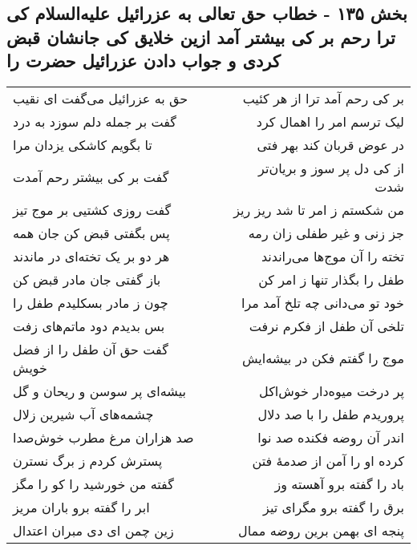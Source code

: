 \begin{center}
\section*{بخش ۱۳۵ - خطاب حق تعالی به عزرائیل علیه‌السلام کی ترا رحم بر کی بیشتر آمد ازین خلایق کی جانشان قبض کردی و جواب دادن عزرائیل حضرت را}
\label{sec:sh135}
\begin{longtable}{l p{0.5cm} r}
حق به عزرائیل می‌گفت ای نقیب
&&
بر کی رحم آمد ترا از هر کئیب
\\
گفت بر جمله دلم سوزد به درد
&&
لیک ترسم امر را اهمال کرد
\\
تا بگویم کاشکی یزدان مرا
&&
در عوض قربان کند بهر فتی
\\
گفت بر کی بیشتر رحم آمدت
&&
از کی دل پر سوز و بریان‌تر شدت
\\
گفت روزی کشتیی بر موج تیز
&&
من شکستم ز امر تا شد ریز ریز
\\
پس بگفتی قبض کن جان همه
&&
جز زنی و غیر طفلی زان رمه
\\
هر دو بر یک تخته‌ای در ماندند
&&
تخته را آن موج‌ها می‌راندند
\\
باز گفتی جان مادر قبض کن
&&
طفل را بگذار تنها ز امر کن
\\
چون ز مادر بسکلیدم طفل را
&&
خود تو می‌دانی چه تلخ آمد مرا
\\
بس بدیدم دود ماتم‌های زفت
&&
تلخی آن طفل از فکرم نرفت
\\
گفت حق آن طفل را از فضل خویش
&&
موج را گفتم فکن در بیشه‌ایش
\\
بیشه‌ای پر سوسن و ریحان و گل
&&
پر درخت میوه‌دار خوش‌اکل
\\
چشمه‌های آب شیرین زلال
&&
پروریدم طفل را با صد دلال
\\
صد هزاران مرغ مطرب خوش‌صدا
&&
اندر آن روضه فکنده صد نوا
\\
پسترش کردم ز برگ نسترن
&&
کرده او را آمن از صدمهٔ فتن
\\
گفته من خورشید را کو را مگز
&&
باد را گفته برو آهسته وز
\\
ابر را گفته برو باران مریز
&&
برق را گفته برو مگرای تیز
\\
زین چمن ای دی مبران اعتدال
&&
پنجه ای بهمن برین روضه ممال
\\
\end{longtable}
\end{center}
